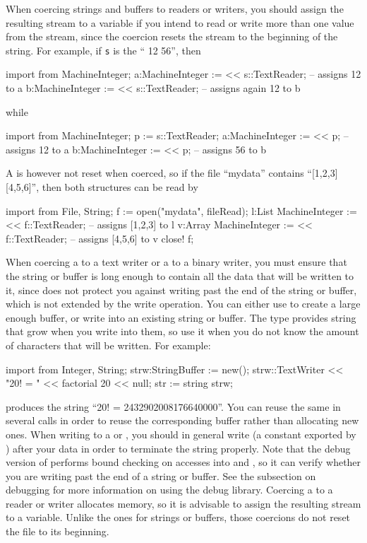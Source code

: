 When coercing strings and buffers to readers or writers, you should assign the
resulting stream to a variable if you intend to read or write more than
one value from the stream, since the coercion resets the stream
to the beginning of the string. For example, if {\tt s} is the 
``   12   56'', then
\begin{ttyout}
import from MachineInteger;
a:MachineInteger := << s::TextReader;             -- assigns 12 to a
b:MachineInteger := << s::TextReader;             -- assigns again 12 to b
\end{ttyout}
\noindent
while
\begin{ttyout}
import from MachineInteger;
p := s::TextReader;
a:MachineInteger := << p;                         -- assigns 12 to a
b:MachineInteger := << p;                         -- assigns 56 to b
\end{ttyout}
\noindent
A  is however not reset when coerced, so if the file ``mydata''
contains ``[1,2,3]  [4,5,6]'', then both structures can be read by
\begin{ttyout}
import from File, String;
f := open("mydata", fileRead);
l:List MachineInteger := << f::TextReader;        -- assigns [1,2,3] to l
v:Array MachineInteger := << f::TextReader;       -- assigns [4,5,6] to v
close! f;
\end{ttyout}
\noindent
When coercing a  to a text writer or a
 to a binary writer, you must ensure
that the string or buffer is long enough to contain all the data
that will be written to
it, since \libaldor{} does not protect you against writing past the end of the
string or buffer, which is not extended by the write operation. You can
either use 
to create a large enough buffer,
or write into an existing string or buffer.
The type  provides string that grow when you write
into them, so use it when you do not know the amount of characters that
will be written. For example:
\begin{ttyout}
import from Integer, String;
strw:StringBuffer := new();
strw::TextWriter << "20! = " << factorial 20 << null;
str := string strw;
\end{ttyout}
produces the string ``20! = 2432902008176640000''.
You can reuse the same  in several calls in order
to reuse the corresponding buffer rather than allocating new ones.
When writing to a  or ,
you should in general
write  (a constant exported by )
after your data in order to terminate the string properly.
Note that the debug version of \libaldor{} performs bound checking on
accesses into  and ,
so it can verify whether you are writing past
the end of a string or buffer. See the subsection on debugging for more
information on using the debug library.
Coercing a  to a reader or writer allocates memory, so it
is advisable to assign the resulting stream to a variable. Unlike the ones
for strings or buffers, those coercions do not reset the file to its beginning.

